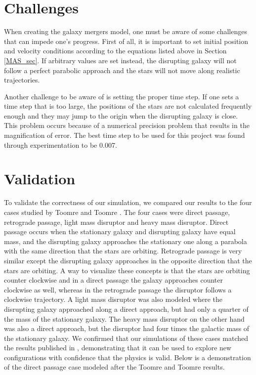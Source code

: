 \documentclass[11pt]{article}
\begin{document}
\section{Challenges}

When creating the galaxy mergers model, one must be aware of some challenges that can impede one's progress.  First of all, it is important to set initial position and velocity conditions according to the equations listed above in Section \ref{MAS_sec}.  If arbitrary values are set instead, the disrupting galaxy will not follow a perfect parabolic approach and the stars will not move along realistic trajectories.

Another challenge to be aware of is setting the proper time step.  If one sets a time step that is too large, the positions of the stars are not calculated frequently enough and they may jump to the origin when the disrupting galaxy is close.  This problem occurs because of a numerical precision problem that results in the magnification of error.  The best time step to be used for this project was found through experimentation to be 0.007.

\section{Validation}

To validate the correctness of our simulation, we compared our results to the four cases studied by Toomre and Toomre \cite{Toomre1972}.  The four cases were direct passage, retrograde passage, light mass disruptor and heavy mass disruptor.  Direct passage occurs when the stationary galaxy and disrupting galaxy have equal mass, and the disrupting galaxy approaches the stationary one along a parabola with the same direction that the stars are orbiting.   Retrograde passage is very similar except the disrupting galaxy approaches in the opposite direction that the stars are orbiting.  A way to visualize these concepts is that the stars are orbiting counter clockwise and in a direct passage the galaxy approaches counter clockwise as well, whereas in the retrograde passage the disruptor follows a clockwise trajectory.  A light mass disruptor was also modeled where the disrupting galaxy approached along a direct approach, but had only a quarter of the mass of the stationary galaxy.  The heavy mass disruptor on the other hand was also a direct approach, but the disruptor had four times the galactic mass of the stationary galaxy.  We confirmed that our simulations of these cases matched the results published in \cite{Toomre1972}, demonstrating that it can be used to explore new configurations with confidence that the physics is valid. Below is a demonstration of the direct passage case modeled after the Toomre and Toomre results.
\end{document}
